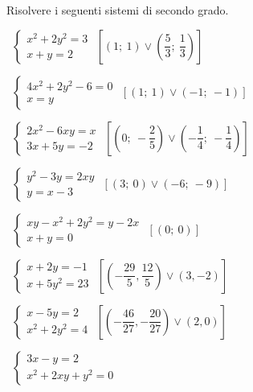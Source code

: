 
\begin{esercizio}[\Ast]
 \label{ese:6.1}
Risolvere i seguenti sistemi di secondo grado.
\begin{multicols}{2}
 \begin{enumeratea}
 \item~$\left\{\begin{array}{l}x^2+2y^2=3\\x+y=2\end{array}\right.$
\hfill$\left[\left(1;~1\right) \vee \left(\dfrac 5 3;~\dfrac 1 
3\right)\right]$
 \item~$\left\{\begin{array}{l}4x^2+2y^2-6=0\\x=y\end{array}\right.$
\hfill$\left[\left(1;~1\right)\vee \left(-1;~-1\right)\right]$
 \item~$\left\{\begin{array}{l}2x^2-6xy=x\\3x+5y=-2\end{array}\right.$
\hfill$\left[\left(0;~-\dfrac 2 5\right)\vee 
       \left(-\dfrac 1 4;~-\dfrac 1 4\right)\right]$
 \item~$\left\{\begin{array}{l}y^2-3y=2xy\\y=x-3\end{array}\right.$
\hfill$\left[\left(3;~0\right)\vee \left(-6;~-9\right)\right]$
 \item~$\left\{\begin{array}{l}xy-x^2+2y^2=y-2x\\x+y=0\end{array}\right.$
\hfill$\left[\left(0;~0\right)\right]$
 \item~$\left\{\begin{array}{l}{x+2y=-1}\\{x+5y^2=23}\end{array}\right.$
\hfill$\left[\left(-\dfrac{29} 5,\dfrac{12} 5\right) \vee 
       (3,-2)\right]$
 \item~$\left\{\begin{array}{l}{x-5y=2}\\{x^2+2y^2=4}\end{array}\right.$
\hfill$\left[\left(-\dfrac{46}{27},-\dfrac{20}{27}\right)\vee (2,0)\right]$
 \item~$\left\{\begin{array}{l}3x-y=2\\x^2+2xy+y^2=0\end{array}\right.$

\end{enumeratea}
\end{multicols}
\end{esercizio}
